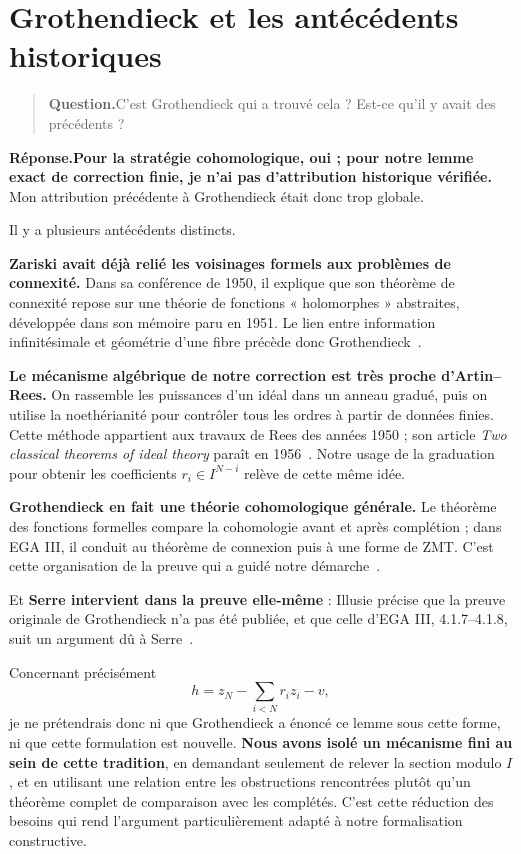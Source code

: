 \documentclass[11pt,a4paper]{article}
\newcommand{\question}[1]{\begin{quote}\textbf{Question.}\enspace #1\end{quote}}
\newcommand{\reponse}{\noindent\textbf{Réponse.}\enspace}
\begin{document}
\section{Grothendieck et les antécédents historiques}

\question{C'est Grothendieck qui a trouvé cela ? Est-ce qu'il y avait
des précédents ?}

\reponse \textbf{Pour la stratégie cohomologique, oui ; pour notre lemme
exact de correction finie, je n'ai pas d'attribution historique
vérifiée.} Mon attribution précédente à Grothendieck était donc trop
globale.

Il y a plusieurs antécédents distincts.

\textbf{Zariski avait déjà relié les voisinages formels aux problèmes
de connexité.} Dans sa conférence de 1950, il explique que son théorème
de connexité repose sur une théorie de fonctions « holomorphes »
abstraites, développée dans son mémoire paru en 1951. Le lien entre
information infinitésimale et géométrie d'une fibre précède donc
Grothendieck~\cite[\S5]{Z1950}\cite{Z1951}.

\textbf{Le mécanisme algébrique de notre correction est très proche
d'Artin--Rees.} On rassemble les puissances d'un idéal dans un anneau
gradué, puis on utilise la noethérianité pour contrôler tous les ordres
à partir de données finies. Cette méthode appartient aux travaux de
Rees des années 1950 ; son article \emph{Two classical theorems of ideal
theory} paraît en 1956~\cite{Rees}. Notre usage de la graduation pour
obtenir les coefficients $r_i\in I^{N-i}$ relève de cette même idée.

\textbf{Grothendieck en fait une théorie cohomologique générale.}
Le théorème des fonctions formelles compare la cohomologie avant et
après complétion ; dans EGA III, il conduit au théorème de connexion
puis à une forme de ZMT. C'est cette organisation de la preuve qui a
guidé notre démarche~\cite[\S\S4.1--4.4]{EGAIII}.

Et \textbf{Serre intervient dans la preuve elle-même} : Illusie précise
que la preuve originale de Grothendieck n'a pas été publiée, et que
celle d'EGA III, 4.1.7--4.1.8, suit un argument dû à
Serre~\cite[remarque 2.3(c)]{Illusie}.

Concernant précisément
\[
 h=z_N-\sum_{i<N}r_i z_i-v,
\]
je ne prétendrais donc ni que Grothendieck a énoncé ce lemme sous cette
forme, ni que cette formulation est nouvelle. \textbf{Nous avons isolé
un mécanisme fini au sein de cette tradition}, en demandant seulement
de relever la section modulo $I$, et en utilisant une relation entre
les obstructions rencontrées plutôt qu'un théorème complet de
comparaison avec les complétés. C'est cette réduction des besoins qui
rend l'argument particulièrement adapté à notre formalisation
constructive.
\end{document}
